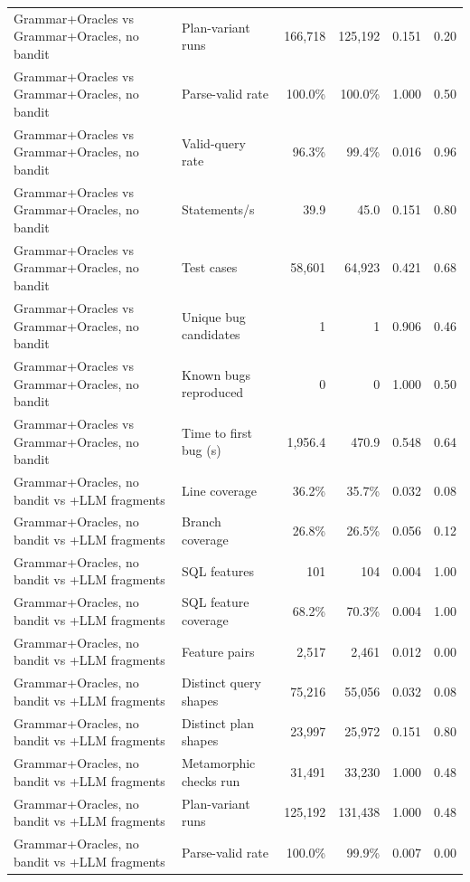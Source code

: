 \begin{table}[t]
\begin{tabular}{llrrrr}
    Grammar+Oracles vs Grammar+Oracles, no bandit & Plan-variant runs & 166{,}718 & 125{,}192 & 0.151 & 0.20 \\
    Grammar+Oracles vs Grammar+Oracles, no bandit & Parse-valid rate & 100.0\% & 100.0\% & 1.000 & 0.50 \\
    Grammar+Oracles vs Grammar+Oracles, no bandit & Valid-query rate & 96.3\% & 99.4\% & 0.016 & 0.96 \\
    Grammar+Oracles vs Grammar+Oracles, no bandit & Statements/s & 39.9 & 45.0 & 0.151 & 0.80 \\
    Grammar+Oracles vs Grammar+Oracles, no bandit & Test cases & 58{,}601 & 64{,}923 & 0.421 & 0.68 \\
    Grammar+Oracles vs Grammar+Oracles, no bandit & Unique bug candidates & 1 & 1 & 0.906 & 0.46 \\
    Grammar+Oracles vs Grammar+Oracles, no bandit & Known bugs reproduced & 0 & 0 & 1.000 & 0.50 \\
    Grammar+Oracles vs Grammar+Oracles, no bandit & Time to first bug (s) & 1{,}956.4 & 470.9 & 0.548 & 0.64 \\
    Grammar+Oracles, no bandit vs +LLM fragments & Line coverage & 36.2\% & 35.7\% & 0.032 & 0.08 \\
    Grammar+Oracles, no bandit vs +LLM fragments & Branch coverage & 26.8\% & 26.5\% & 0.056 & 0.12 \\
    Grammar+Oracles, no bandit vs +LLM fragments & SQL features & 101 & 104 & 0.004 & 1.00 \\
    Grammar+Oracles, no bandit vs +LLM fragments & SQL feature coverage & 68.2\% & 70.3\% & 0.004 & 1.00 \\
    Grammar+Oracles, no bandit vs +LLM fragments & Feature pairs & 2{,}517 & 2{,}461 & 0.012 & 0.00 \\
    Grammar+Oracles, no bandit vs +LLM fragments & Distinct query shapes & 75{,}216 & 55{,}056 & 0.032 & 0.08 \\
    Grammar+Oracles, no bandit vs +LLM fragments & Distinct plan shapes & 23{,}997 & 25{,}972 & 0.151 & 0.80 \\
    Grammar+Oracles, no bandit vs +LLM fragments & Metamorphic checks run & 31{,}491 & 33{,}230 & 1.000 & 0.48 \\
    Grammar+Oracles, no bandit vs +LLM fragments & Plan-variant runs & 125{,}192 & 131{,}438 & 1.000 & 0.48 \\
    Grammar+Oracles, no bandit vs +LLM fragments & Parse-valid rate & 100.0\% & 99.9\% & 0.007 & 0.00 \\

\end{tabular}
\end{table}

